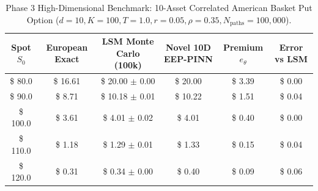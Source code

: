 \begin{table}[h!]
\centering
\small
\caption{Phase 3 High-Dimensional Benchmark: 10-Asset Correlated American Basket Put Option ($d=10, K=100, T=1.0, r=0.05, \rho=0.35, N_{\text{paths}}=100,000$).}
\label{tab:10d_benchmarks}
\begin{tabular}{@{}cccccc@{}}
\toprule
\textbf{Spot $S_0$} & \textbf{European Exact} & \textbf{LSM Monte Carlo (100k)} & \textbf{Novel 10D EEP-PINN} & \textbf{Premium $e_\theta$} & \textbf{Error vs LSM} \\ \midrule
\$ 80.0 & \$ 16.61 & \$ 20.00 $\pm$ 0.00 & \$ 20.00 & \$ 3.39 & \$ 0.00 \\
\$ 90.0 & \$ 8.71 & \$ 10.18 $\pm$ 0.01 & \$ 10.22 & \$ 1.51 & \$ 0.04 \\
\$ 100.0 & \$ 3.61 & \$ 4.01 $\pm$ 0.02 & \$ 4.01 & \$ 0.40 & \$ 0.00 \\
\$ 110.0 & \$ 1.18 & \$ 1.29 $\pm$ 0.01 & \$ 1.33 & \$ 0.15 & \$ 0.04 \\
\$ 120.0 & \$ 0.31 & \$ 0.34 $\pm$ 0.00 & \$ 0.40 & \$ 0.09 & \$ 0.06 \\
\bottomrule
\end{tabular}
\end{table}
